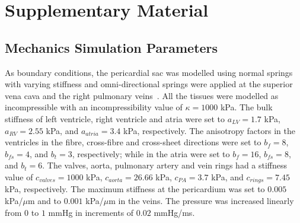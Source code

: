 \section{Supplementary Material}



\subsection{Mechanics Simulation Parameters}
As boundary conditions, the pericardial sac was modelled using normal springs with varying stiffness and 
omni-directional springs were applied at the superior vena cava and the
right pulmonary veins~\cite{strocchi2023_cell}. 
All the tissues were modelled as incompressible with an incompressibility value of $\kappa=1000$ kPa. 
The bulk stiffness of left ventricle, right ventricle and atria were set to 
$a_{LV}=1.7$ kPa, 
$a_{RV}=2.55$ kPa, and 
$a_{atria}=3.4$ kPa, respectively. 
The anisotropy factors in the ventricles in the fibre, cross-fibre and cross-sheet directions were set to 
$b_f=8$, 
$b_{fs}=4$, and 
$b_t=3$, respectively; 
while in the atria were set to 
$b_f=16$, 
$b_{fs}=8$, and 
$b_t=6$. 
The valves, aorta, pulmonary artery and vein rings had a stiffness value of 
$c_{valves}=1000$ kPa, 
$c_{aorta}=26.66$ kPa, 
$c_{PA}=3.7$ kPa, and 
$c_{rings}=7.45$ kPa, respectively. 
The maximum stiffness at the pericardium was set to $0.005$ kPa/$\mu$m and to $0.001$ kPa/$\mu$m in the veins. 
The pressure was increased linearly from $0$ to $1$ mmHg in increments of $0.02$ mmHg/ms.

